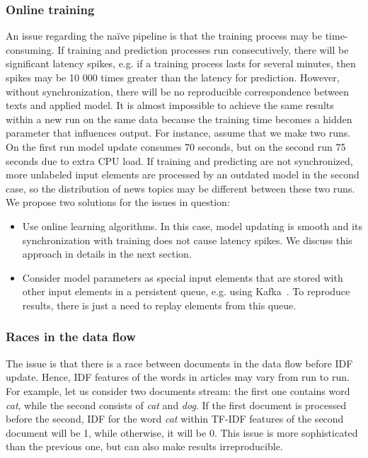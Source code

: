 \subsubsection{Online training}
An issue regarding the na\"ive pipeline is that the training process may be time-consuming. If training and prediction processes run consecutively, there will be significant latency spikes, e.g. if a training process lasts for several minutes, then spikes may be 10 000 times greater than the latency for prediction. However, without synchronization, there will be no reproducible correspondence between texts and applied model. It is almost impossible to achieve the same results within a new run on the same data because the training time becomes a hidden parameter that influences output. For instance, assume that we make two runs. On the first run model update consumes 70 seconds, but on the second run 75 seconds due to extra CPU load. If training and predicting are not synchronized, more unlabeled input elements are processed by an outdated model in the second case, so the distribution of news topics may be different between these two runs. We propose two solutions for the issues in question:

\begin{itemize}
    \item Use online learning algorithms. In this case, model updating is smooth and its synchronization with training does not cause latency spikes. We discuss this approach in details in the next section.
    \item Consider model parameters as special input elements that are stored with other input elements in a persistent queue, e.g. using Kafka~\cite{kreps2011kafka}. To reproduce results, there is just a need to replay elements from this queue.
\end{itemize}

\subsubsection{Races in the data flow}
The issue is that there is a race between documents in the data flow before IDF update. Hence, IDF features of the words in articles may vary from run to run. For example, let us consider two documents stream: the first one contains word {\em cat}, while the second consists of {\em cat} and {\em dog}. If the first document is processed before the second, IDF for the word {\em cat} within TF-IDF features of the second document will be 1, while otherwise, it will be 0. This issue is more sophisticated than the previous one, but can also make results irreproducible. 

